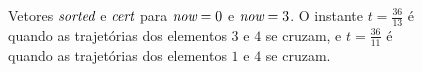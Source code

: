 \begin{figure}[H]
    \centering
    \caption[Exemplo das estruturas utilizadas na lista ordenada]{Vetores $\textit{sorted}$ e $\textit{cert}$ para
        $\textit{now} = 0$ e $\textit{now} = 3$.
        O instante $t = \frac{36}{13}$ é quando as trajetórias dos elementos $3$ e $4$ se cruzam, e
        $t = \frac{36}{11}$ é quando as trajetórias dos elementos $1$ e $4$ se cruzam.}
    \label{fig:lista:variaveis}
\end{figure}

